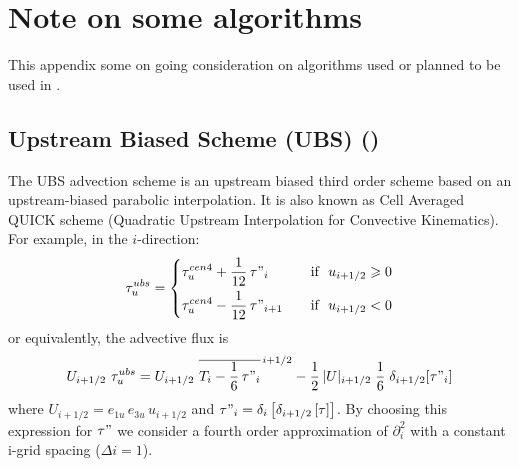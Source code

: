 \documentclass[../main/NEMO_manual]{subfiles}
\begin{document}
\chapter{Note on some algorithms}
\label{apdx:E}

\minitoc

\newpage

This appendix some on going consideration on algorithms used or planned to be used in \NEMO. 

\section{Upstream Biased Scheme (UBS) (\protect{})}
\label{sec:TRA_adv_ubs}

The UBS advection scheme is an upstream biased third order scheme based on
an upstream-biased parabolic interpolation.
It is also known as Cell Averaged QUICK scheme (Quadratic Upstream Interpolation for Convective Kinematics).
For example, in the $i$-direction:
\begin{equation}
  \label{eq:tra_adv_ubs2}
  \tau_u^{ubs} = \left\{
	 \begin{aligned}
      & \tau_u^{cen4} + \frac{1}{12} \,\tau"_i	   & \quad \text{if }\ u_{i+1/2} \geqslant 0 \\
      & \tau_u^{cen4} - \frac{1}{12} \,\tau"_{i+1} & \quad \text{if }\ u_{i+1/2}       <       0
    \end{aligned}
  \right.
\end{equation}
or equivalently, the advective flux is
\begin{equation}
  \label{eq:tra_adv_ubs2}
  U_{i+1/2} \ \tau_u^{ubs}
  =U_{i+1/2} \ \overline{ T_i - \frac{1}{6}\,\tau"_i }^{\,i+1/2}
  - \frac{1}{2}\, |U|_{i+1/2} \;\frac{1}{6} \;\delta_{i+1/2}[\tau"_i]
\end{equation}
where $U_{i+1/2} = e_{1u}\,e_{3u}\,u_{i+1/2}$ and
$\tau "_i =\delta_i \left[ {\delta_{i+1/2} \left[ \tau \right]} \right]$.
By choosing this expression for $\tau "$ we consider a fourth order approximation of $\partial_i^2$ with
a constant i-grid spacing ($\Delta i=1$).
\end{document}
